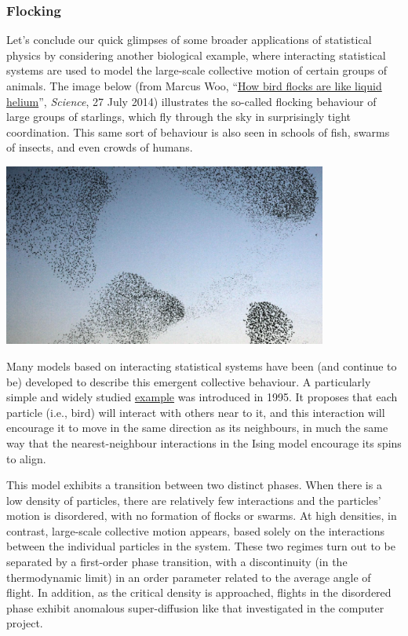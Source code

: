 \subsubsection*{Flocking}
Let's conclude our quick glimpses of some broader applications of statistical physics by considering another biological example, where interacting statistical systems are used to model the large-scale collective motion of certain groups of animals.
The image below (from Marcus Woo, ``\href{https://www.sciencemag.org/news/2014/07/how-bird-flocks-are-liquid-helium}{How bird flocks are like liquid helium}'', \textit{Science}, 27 July 2014) illustrates the so-called flocking behaviour of large groups of starlings, which fly through the sky in surprisingly tight coordination.
This same sort of behaviour is also seen in schools of fish, swarms of insects, and even crowds of humans.

\begin{center}\includegraphics[width=0.8\textwidth]{figs/unit10_flock.pdf}\end{center}

Many models based on interacting statistical systems have been (and continue to be) developed to describe this emergent collective behaviour.
A particularly simple and widely studied \href{https://en.wikipedia.org/wiki/Vicsek_model}{example} was introduced in 1995.
It proposes that each particle (i.e., bird) will interact with others near to it, and this interaction will encourage it to move in the same direction as its neighbours, in much the same way that the nearest-neighbour interactions in the Ising model encourage its spins to align.

This model exhibits a transition between two distinct phases.
When there is a low density of particles, there are relatively few interactions and the particles' motion is disordered, with no formation of flocks or swarms.
At high densities, in contrast, large-scale collective motion appears, based solely on the interactions between the individual particles in the system.
These two regimes turn out to be separated by a first-order phase transition, with a discontinuity (in the thermodynamic limit) in an order parameter related to the average angle of flight.
In addition, as the critical density is approached, flights in the disordered phase exhibit anomalous super-diffusion like that investigated in the computer project.



